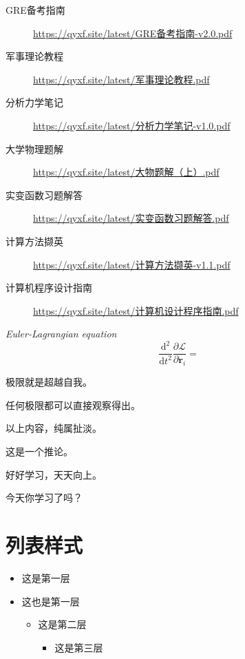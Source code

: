 \documentclass[
  10pt,
  twoside,
  openany,
  b5paper, %
  colorscheme = bootstrap-v4, %
]{qyxf-book}
\numberwithin{equation}{section}
\newcommand{\md}{\mathrm{d}}
\newcommand{\dd}[2]{\dfrac{\md^2 #1}{\md #2^2}}
\newcommand{\p}[2]{\dfrac{\partial #1}{\partial #2}}
\newcommand{\vr}{\boldsymbol{r}}
\newcommand{\dvr}{\dot{\vr}}
\newcommand{\lag}{\mathcal{L}} %
\begin{document}
\begin{tcolorbox}
	\begin{description}
		\item [GRE备考指南] \url{https://qyxf.site/latest/GRE备考指南-v2.0.pdf}
		\item [军事理论教程] \url{https://qyxf.site/latest/军事理论教程.pdf}
		\item [分析力学笔记] \url{https://qyxf.site/latest/分析力学笔记-v1.0.pdf}
		\item [大学物理题解] \url{https://qyxf.site/latest/大物题解（上）.pdf}
		\item [实变函数习题解答] \url{https://qyxf.site/latest/实变函数习题解答.pdf}
		\item [计算方法撷英] \url{https://qyxf.site/latest/计算方法撷英-v1.1.pdf}
		\item [计算机程序设计指南] \url{https://qyxf.site/latest/计算机设计程序指南.pdf}
	\end{description}
\end{tcolorbox}

\begin{pequation}
	\textit{Euler-Lagrangian equation}
	$$
	\dd{}{t}\p{\lag}{\dvr_i}=
	$$
\end{pequation}

\begin{define}
  极限就是超越自我。
\end{define}

\begin{theorem}
  任何极限都可以直接观察得出。
\end{theorem}

\begin{lemma}
  以上内容，纯属扯淡。
\end{lemma}

\begin{corollary}
 这是一个推论。
\end{corollary}

\begin{note}
  好好学习，天天向上。
\end{note}

\begin{alert}
  今天你学习了吗？
\end{alert}

\section{列表样式}
\begin{itemize}
  \item 这是第一层
  \item 这也是第一层
  \begin{itemize}
    \item 这是第二层
    \begin{itemize}
      \item 这是第三层
    \end{itemize}
  \end{itemize}
\end{itemize}
\end{document}
